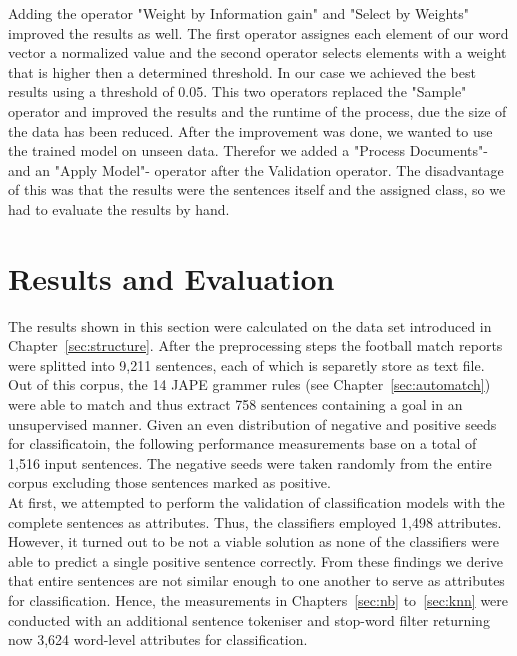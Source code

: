 \documentclass[11pt,titlepage,oneside,openany]{book}
\begin{document}
Adding the operator "Weight by Information gain" and "Select by Weights" improved the results as well. The first operator assignes each element of our word vector a normalized value and the second operator selects elements with a weight that is higher then a determined threshold. In our case we achieved the best results using a threshold of 0.05. This two operators replaced the "Sample" operator and improved the results and the runtime of the process, due the size of the data has been reduced.
After the improvement was done, we wanted to use the trained model on unseen data. Therefor we added a "Process Documents"- and an "Apply Model"- operator after the Validation operator. The disadvantage of this was that the results were the sentences itself and the assigned class, so we had to evaluate the results by hand. 

\section{Results and Evaluation}
\label{sec:eval}

The results shown in this section were calculated on the data set introduced in Chapter~\ref{sec:structure}. After the preprocessing steps the football match reports were splitted into 9,211 sentences, each of which is separetly store as text file. Out of this corpus, the 14 JAPE grammer rules (see Chapter~\ref{sec:automatch}) were able to match and thus extract 758 sentences containing a goal in an unsupervised manner. Given an even distribution of negative and positive seeds for classificatoin, the following performance measurements base on a total of 1,516 input sentences. The negative seeds were taken randomly from the entire corpus excluding those sentences marked as positive.\\
At first, we attempted to perform the validation of classification models with the complete sentences as attributes. Thus, the classifiers employed 1,498 attributes. However, it turned out to be not a viable solution as none of the classifiers were able to predict a single positive sentence correctly. From these findings we derive that entire sentences are not similar enough to one another to serve as attributes for classification. Hence, the measurements in Chapters~\ref{sec:nb} to~\ref{sec:knn} were conducted with an additional sentence tokeniser and stop-word filter returning now 3,624 word-level attributes for classification.

\end{document}
